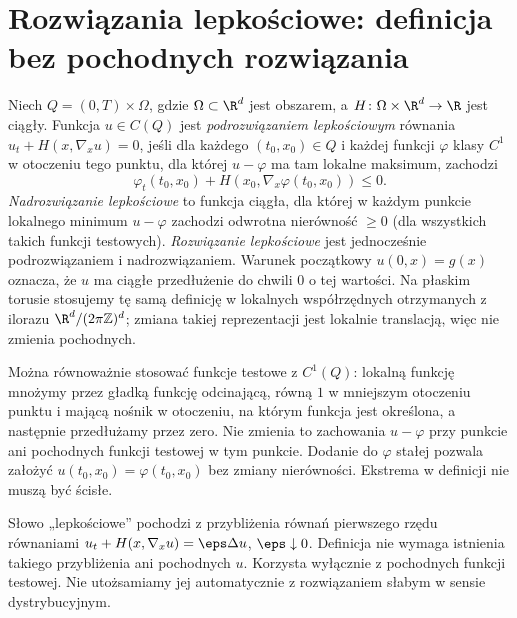 \section{Rozwiązania lepkościowe: definicja bez pochodnych rozwiązania}
\begin{definicja}
\label{def:pde23-visc}
Niech $Q=(0,T)\times\Omega$, gdzie $\Omega\subset\R^d$
jest obszarem, a $H\colon\Omega\times\R^d\to\R$ jest
ciągły. Funkcja $u\in C(Q)$ jest \emph{podrozwiązaniem
lepkościowym} równania $u_t+H(x,\nabla_xu)=0$, jeśli dla
każdego $(t_0,x_0)\in Q$ i każdej funkcji
$\varphi$ klasy $C^1$ w otoczeniu tego punktu, dla której
$u-\varphi$ ma tam lokalne maksimum, zachodzi
\begin{equation}\label{eq:pde23-sub}
 \varphi_t(t_0,x_0)+H(x_0,\nabla_x\varphi(t_0,x_0))\le0.
\end{equation}
\emph{Nadrozwiązanie lepkościowe} to funkcja ciągła, dla której
w każdym punkcie lokalnego minimum $u-\varphi$ zachodzi
odwrotna nierówność $\ge0$ (dla wszystkich takich funkcji
testowych). \emph{Rozwiązanie lepkościowe}
jest jednocześnie podrozwiązaniem i nadrozwiązaniem.
Warunek początkowy $u(0,x)=g(x)$ oznacza, że
$u$ ma ciągłe przedłużenie do chwili $0$ o tej wartości.
Na płaskim torusie stosujemy tę samą definicję
w lokalnych współrzędnych otrzymanych z ilorazu
$\R^d/(2\pi\mathbb Z)^d$; zmiana takiej reprezentacji
jest lokalnie translacją, więc nie zmienia pochodnych.
\end{definicja}

\begin{uwaga}
Można równoważnie stosować funkcje testowe z $C^1(Q)$:
lokalną funkcję mnożymy przez gładką funkcję odcinającą,
równą $1$ w mniejszym otoczeniu punktu i mającą nośnik
w otoczeniu, na którym funkcja jest określona,
a następnie przedłużamy przez zero.
Nie zmienia to zachowania $u-\varphi$ przy punkcie
ani pochodnych funkcji testowej w tym punkcie.
Dodanie do $\varphi$ stałej pozwala założyć
$u(t_0,x_0)=\varphi(t_0,x_0)$ bez zmiany nierówności.
Ekstrema w definicji nie muszą być ścisłe.
\end{uwaga}

\begin{uwaga}
Słowo „lepkościowe” pochodzi z przybliżenia równań pierwszego
rzędu równaniami $u_t+H(x,\nabla_xu)=\eps\Delta u$,
$\eps\downarrow0$. Definicja nie wymaga istnienia takiego
przybliżenia ani pochodnych $u$. Korzysta wyłącznie
z pochodnych funkcji testowej.
Nie utożsamiamy jej automatycznie z rozwiązaniem słabym
w sensie dystrybucyjnym.
\end{uwaga}

